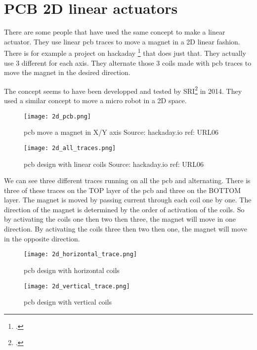 \section{PCB 2D linear actuators}

There are some people that have used the same concept to make a linear actuator. They use linear \gls{pcb} traces to move a magnet in a 2D linear fashion. There is for example a project on hackaday \footcite{noauthor_2d_nodate} that does just that. They actually use 3 different for each axis. They alternate those 3 coils made with \gls{pcb} traces to move the magnet in the desired direction.

The concept seems to have been developped and tested by SRI\footcite{sri_magnetically_2014} in 2014. They used a similar concept to move a micro robot in a 2D space.

\begin{figure}[H]
	\centering
	\texttt{[image: 2d\_pcb.png]}
	\caption[2D X/Y \gls{pcb} actuator by Bobricius]{\gls{pcb} move a magnet in X/Y axis  Source: hackaday.io ref: URL06}
	\label{fig:2d_pcb}
\end{figure}

\begin{figure}[H]
	\centering
	\texttt{[image: 2d\_all\_traces.png]}
	\caption[\gls{pcb} design 2D actuator]{\gls{pcb} design with linear coils Source: hackaday.io ref: URL06}
	\label{fig:2d_all_traces}
\end{figure}

We can see three different traces running on all the \gls{pcb} and alternating. There is three of these traces on the TOP layer of the \gls{pcb} and three on the BOTTOM layer. The magnet is moved by passing current through each coil one by one. The direction of the magnet is determined by the order of activation of the coils. So by activating the coils one then two then three, the magnet will move in one direction. By activating the coils three then two then one, the magnet will move in the opposite direction.

\begin{figure}[H]
	\centering
	\texttt{[image: 2d\_horizontal\_trace.png]}
	\caption[\gls{pcb} design horizontal traces]{\gls{pcb} design with horizontal coils}
	\label{fig:2d_horizontal_traces}
\end{figure}

\begin{figure}[H]
	\centering
	\texttt{[image: 2d\_vertical\_trace.png]}
	\caption[\gls{pcb} design vertical traces]{\gls{pcb} design with vertical coils}
	\label{fig:2d_vertical_traces}
\end{figure}

